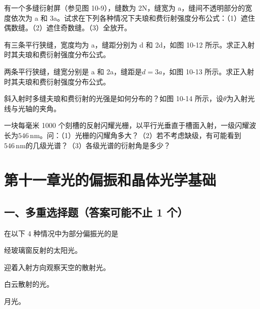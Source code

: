 \documentclass[padl, analysis, notocnum]{ExBook}
\newcommand{\answerarea}[1][3.5cm]{%
  \par\vspace{1mm}%
  \noindent{\color{themeColor!35}\rule{\linewidth}{0.4pt}}\par
  \noindent\begin{minipage}[t][#1][t]{\linewidth}\vspace{0pt}\end{minipage}\par
  \noindent{\color{themeColor!35}\rule{\linewidth}{0.4pt}}\par
}
\begin{document}
\begin{qitems}[startnum=6]
\qitem 有一个多缝衍射屏（参见图 10-9），缝数为 2N，缝宽为 a，缝间不透明部分的宽度依次为 a 和 3a。试求在下列各种情况下夫琅和费衍射强度分布公式：（1）遮住偶数缝。（2）遮住奇数缝。（3）全放开。
\label{q:295:start}
\answerarea[2.4cm]
\label{q:295:end}
\end{qitems}

\begin{qitems}[startnum=7]
\qitem 有三条平行狭缝，宽度均为 a，缝距分别为 d 和 2d，如图 10-12 所示。求正入射时其夫琅和费衍射强度分布公式。
\label{q:296:start}
\answerarea[2.4cm]
\label{q:296:end}
\end{qitems}

\begin{qitems}[startnum=8]
\qitem 两条平行狭缝，缝宽分别是 a 和 2a，缝距是$d=3a$，如图 10-13 所示。求正入射时其夫琅和费衍射强度分布公式。
\label{q:297:start}
\answerarea[2.4cm]
\label{q:297:end}
\end{qitems}

\begin{qitems}[startnum=9]
\qitem 斜入射时多缝夫琅和费衍射的光强是如何分布的？如图 10-14 所示，设$\theta$为入射光线与光轴的夹角。
\label{q:298:start}
\answerarea[2.4cm]
\label{q:298:end}
\end{qitems}

\begin{qitems}[startnum=10]
\qitem 一块每毫米 1000 个刻槽的反射闪耀光栅，以平行光垂直于槽面入射，一级闪耀波长为$546\,\mathrm{nm}$。问：（1）光栅的闪耀角多大？（2）若不考虑缺级，有可能看到$546\,\mathrm{nm}$的几级光谱？（3）各级光谱的衍射角是多少？
\label{q:299:start}
\answerarea[7.0cm]
\label{q:299:end}
\end{qitems}

\section{第十一章\quad 光的偏振和晶体光学基础}
\subsection{一、多重选择题（答案可能不止 1 个）}
\begin{qitems}[startnum=1]
\qitem 在以下 4 种情况中为部分偏振光的是
\par\noindent\hspace{2em}经玻璃窗反射的太阳光。
\par\noindent\hspace{2em}迎着入射方向观察天空的散射光。
\par\noindent\hspace{2em}白云散射的光。
\par\noindent\hspace{2em}月光。
\label{q:300:start}
\answerarea[4.0cm]
\label{q:300:end}
\end{qitems}
\end{document}
